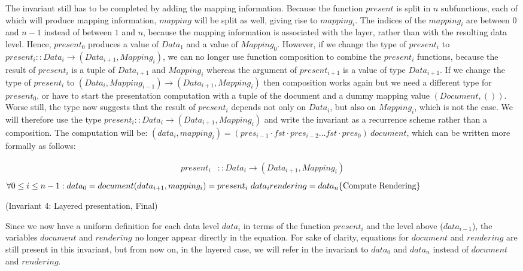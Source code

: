 \documentclass[twoside,epsf]{report}
\begin{document}
The invariant still has to be completed by adding the mapping information. Because the function $present$ is split in $n$ subfunctions, each of which will produce mapping information, $mapping$ will be split as well, giving rise to $mapping_i$. The indices of the $mapping_i$ are between $0$ and $n-1$ instead of between $1$ and $n$, because the mapping information is associated with the layer, rather than with the resulting data level. Hence, $present_0$ produces a value of $Data_1$ and a value of $Mapping_0$. However, if we change the type of $present_i$ to $present_i :: Data_i \rightarrow (Data_{i+1}, Mapping_{i})$, we can no longer use function composition to combine the $present_i$ functions, because the result of $present_i$ is a tuple of $Data_{i+1}$ and $Mapping_{i}$ whereas the argument of $present_{i+1}$ is a value of type $Data_{i+1}$. If we change the type of $present_i$ to $(Data_i, Mapping_{i-1}) \rightarrow (Data_{i+1}, Mapping_i)$ then composition works again but we need a different type for $present_0$, or have to start the presentation computation with a tuple of the document and a dummy mapping value $(Document, ())$. Worse still, the type now suggests that the result of $present_i$ depends not only on $Data_i$, but also on $Mapping_i$, which is not the case. We will therefore use the type $present_i :: Data_i \rightarrow (Data_{i+1}, Mapping_i)$ and write the invariant as a recurrence scheme rather than a composition. The computation will be: $(data_i, mapping_i) = (pres_{i-1} \cdot fst \cdot pres_{i-2} \ldots fst \cdot pres_{0})~document$, which can be written more formally as follows: \begin{small}\begin{align*} %
present_i & :: Data_i \rightarrow (Data_{i+1}, Mapping_{i}) \\
\end{align*}
\begin{math}
\forall 0 \le i \le n-1: \\
data_0 = document \\
(data_{i+1}, mapping_{i}) = present_i~data_i\\
rendering = data_n \hfill \text{\{Compute Rendering\}}
\end{math}\end{small}

{\centering (Invariant 4: Layered presentation, Final)\\}\vspace{1em} 

Since we now have a uniform definition for each data level $data_i$ in terms of the function $present_i$ and the level above ($data_{i-1}$), the variables $document$ and $rendering$ no longer appear directly in the equation. For sake of clarity, equations for $document$ and $rendering$ are still present in this invariant, but from now on, in the layered case, we will refer in the invariant to $data_0$ and $data_n$ instead of $document$ and $rendering$.
\end{document}
